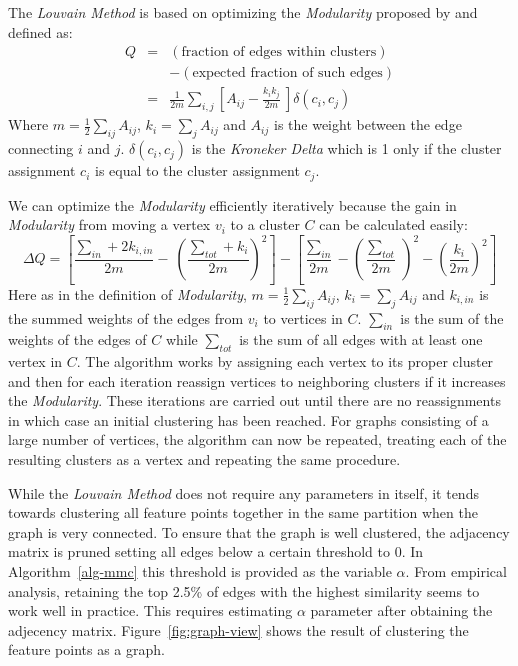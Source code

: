 The \emph{Louvain Method} is based on optimizing the \emph{Modularity} 
proposed by \cite{girvan2002} and defined as:
\begin{eqnarray*}
    Q & = & (\mbox{fraction of edges within clusters}) \\
	  & & - (\mbox{expected fraction of such edges}) \\
	& = & \frac{1}{2m} \sum_{i,j} \left[ A_{ij} - \frac{k_i k_j}{2m} \
\right] \delta(c_i, c_j)
\end{eqnarray*}
Where $m=\frac{1}{2} \sum_{ij} A_{ij}$, $k_i = \sum_j A_{ij}$ and 
$A_{ij}$ is the weight between the edge connecting $i$ and $j$.  
$\delta(c_i, c_j)$ is the \emph{Kroneker Delta} which is 1 only if the 
cluster assignment $c_i$ is equal to the cluster assignment $c_j$.

We can optimize the \emph{Modularity} efficiently iteratively because 
the gain in \emph{Modularity} from moving a vertex $v_i$ to a cluster 
$C$ can be calculated easily:
\begin{equation*}
	\Delta Q = \left[ \frac{\sum_{in} + 2 k_{i,in}}{2m} - \
    \left(\frac{\sum_{tot} + k_i}{2m} \right)^2 \right]
	- \left[\frac{\sum_{in}}{2m} - \left(\frac{\sum_{tot}}{2m} \
	\right)^2 - \left( \frac{k_i}{2m} \right)^2 \right]
\end{equation*}
Here as in the definition of \emph{Modularity}, $m=\frac{1}{2} \sum_{ij} 
A_{ij}$, $k_i = \sum_j A_{ij}$ and $k_{i,in}$ is the summed weights of 
the edges from $v_i$ to vertices in $C$.  $\sum_{in}$ is the sum of the 
weights of the edges of $C$ while $\sum_{tot}$ is the sum of all edges 
with at least one vertex in $C$.  The algorithm works by assigning each 
vertex to its proper cluster and then for each iteration reassign 
vertices to neighboring clusters if it increases the \emph{Modularity}.  
These iterations are carried out until there are no reassignments in 
which case an initial clustering has been reached.  For graphs 
consisting of a large number of vertices, the algorithm can now be 
repeated, treating each of the resulting clusters as a vertex and 
repeating the same procedure.

While the \emph{Louvain Method} does not require any parameters in 
itself, it tends towards clustering all feature points together in the 
same partition when the graph is very connected.  To ensure that the 
graph is well clustered, the adjacency matrix is pruned setting all 
edges below a certain threshold to $0$. In Algorithm~\ref{alg-mmc} this 
threshold is provided as the variable $\alpha$.  From empirical 
analysis, retaining the top 2.5\% of edges with the highest similarity 
seems to work well in practice. This requires estimating $\alpha$ 
parameter after obtaining the adjecency matrix.  
Figure~\ref{fig:graph-view} shows the result of clustering the feature 
points as a graph.

